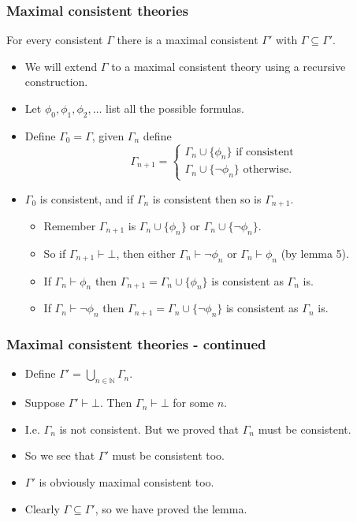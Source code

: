\documentclass[handout]{beamer}
\newcommand{\bN}{\mathbb{N}}
\begin{document}
\begin{frame}
\frametitle{Maximal consistent theories}
\begin{lemma}
For every consistent $\Gamma$ there is a maximal consistent $\Gamma'$ with $\Gamma\subseteq \Gamma'$.
\end{lemma}

\begin{itemize}
\item We will extend $\Gamma$ to a maximal consistent theory using a recursive construction.
\item Let $\phi_0,\phi_1,\phi_2,\ldots$ list all the possible formulas.
\item Define $\Gamma_0= \Gamma$, given $\Gamma_n$ define 
\[\Gamma_{n+1} = \begin{cases}\Gamma_n\cup\{\phi_n\} \text{ if consistent}\\ 
\Gamma_n\cup\{\neg\phi_n\} \text{ otherwise.}\end{cases}\]
\item $\Gamma_0$ is consistent, and if $\Gamma_n$ is consistent then so is $\Gamma_{n+1}$.
\begin{itemize} 
\item Remember $\Gamma_{n+1}$ is $\Gamma_n\cup\{\phi_n\}$ or $\Gamma_n\cup\{\neg\phi_n\}$.
\item So if $\Gamma_{n+1}\vdash \bot$, then either $\Gamma_n\vdash \neg\phi_n$ or $\Gamma_n\vdash \phi_n$ (by lemma 5).
\item If $\Gamma_n\vdash \phi_n$ then $\Gamma_{n+1} = \Gamma_n \cup \{\phi_n\}$ is consistent as $\Gamma_n$ is.
\item If $\Gamma_n\vdash \neg\phi_n$ then $\Gamma_{n+1} = \Gamma_n \cup \{\neg\phi_n\}$ is consistent as $\Gamma_n$ is.
\end{itemize}
\end{itemize}

\end{frame}

\begin{frame}
\frametitle{Maximal consistent theories - continued}
\begin{itemize}
\item Define $\Gamma' = \bigcup_{n\in \bN} \Gamma_n$.
\vspace{0.3cm}
\item Suppose $\Gamma'\vdash \bot$. Then $\Gamma_n\vdash \bot$ for some $n$.
\vspace{0.3cm}
\item I.e. $\Gamma_n$ is not consistent. But we proved that $\Gamma_n$ must be consistent.
\vspace{0.3cm}
\item So we see that $\Gamma'$ must be consistent too.
\vspace{0.3cm}
\item $\Gamma'$ is obviously maximal consistent too.
\vspace{0.3cm}
\item Clearly $\Gamma\subseteq \Gamma'$, so we have proved the lemma.
\end{itemize}

\end{frame}
\end{document}
